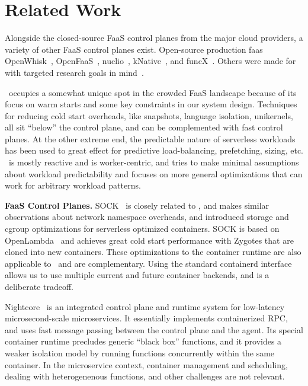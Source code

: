 \section{Related Work}
\label{sec:related}

Alongside the closed-source FaaS control planes from the major cloud providers, a variety of other FaaS control planes exist.
Open-source production faas OpenWhisk~\cite{openwhisk}, OpenFaaS~\cite{openfaas}, nuclio~\cite{nuclio}, kNative~\cite{knative}, and funcX~\cite{funcx_hpdc_20}.
Others were made for with targeted research goals in mind~\cite{jia2021nightcore, hendrickson2016serverless, oakes_sock_2018, singhvi2021atoll,vhive-asplos21}.

\sysname~occupies a somewhat unique spot in the crowded FaaS landscape because of its focus on warm starts and some key constraints in our system design.
%
Techniques for reducing cold start overheads, like snapshots, language isolation,  unikernels, all sit ``below'' the control plane, and can be complemented with fast control planes.
At the other extreme end, the predictable nature of serverless workloads has been used to great effect for predictive load-balancing, prefetching, sizing, etc.
\sysname~is mostly reactive and is worker-centric, and tries to make minimal assumptions about workload predictability and focuses on more general optimizations that can work for arbitrary workload patterns.
%

\noindent \textbf{FaaS Control Planes.}
%
SOCK~\cite{oakes_sock_2018} is closely related to \sysname, and makes similar observations about network namespace overheads, and introduced storage and cgroup optimizations for serverless optimized containers. 
SOCK is based on OpenLambda~\cite{hendrickson2016serverless} and achieves great cold start performance with Zygotes that are cloned into new containers.
These optimizations to the container runtime are also applicable to \sysname~and are complementary. 
Using the standard containerd interface allows us to use multiple current and future container backends, and is a deliberate tradeoff. 


Nightcore~\cite{jia2021nightcore} is an integrated control plane and runtime system for low-latency microsecond-scale microservices.
It essentially implements containerized RPC, and uses fast message passing between the control plane and the agent.
Its special container runtime precludes generic ``black box'' functions, and it provides a weaker isolation model by running functions concurrently within the same container.
In the microservice context, container management and scheduling, dealing with heterogenenous functions, and other challenges are not relevant.


